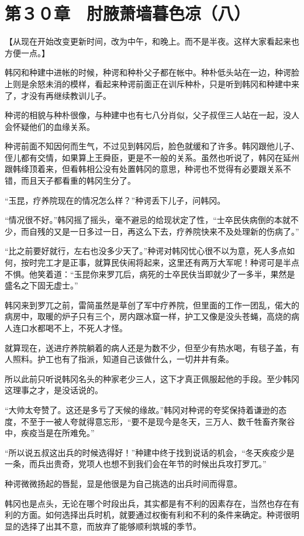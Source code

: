 \section{第３０章　肘腋萧墙暮色凉（八）}

【从现在开始改变更新时间，改为中午，和晚上。而不是半夜。这样大家看起来也方便一点。】

韩冈和种建中进帐的时候，种谔和种朴父子都在帐中。种朴低头站在一边，种谔脸上则是余怒未消的模样，看起来种谔前面正在训斥种朴，只是听到韩冈和种建中来了，才没有再继续教训儿子。

种谔的相貌与种朴很像，与种建中也有七八分肖似，父子叔侄三人站在一起，没人会怀疑他们的血缘关系。

种谔前面不知因何而生气，不过见到韩冈后，脸色就缓和了许多。韩冈跟他儿子、侄儿都有交情，如果算上王舜臣，更是不一般的关系。虽然也听说了，韩冈在延州跟韩绛顶着来，但看韩相公没有处置韩冈的意思，种谔也不觉得有必要跟关系不错，而且天子都看重的韩冈生分了。

“玉昆，疗养院现在的情况怎么样？”种谔丢下儿子，问韩冈。

“情况很不好。”韩冈摇了摇头，毫不避忌的给现状定了性，“士卒民伕病倒的本就不少，而自残的又是一日多过一日，再这么下去，疗养院快来不及处理新的伤病了。”

“比之前要好就行，左右也没多少天了。”种谔对韩冈忧心很不以为意，死人多点如何，按时完工才是正事，就算民伕闹将起来，这里还有两万大军呢！种谔可是半点不惧。他笑着道：“玉昆你来罗兀后，病死的士卒民伕当即就少了一多半，果然是盛名之下固无虚士。”

韩冈来到罗兀之前，雷简虽然是草创了军中疗养院，但里面的工作一团乱，偌大的病房中，取暖的炉子只有三个，房内跟冰窟一样，护工又像是没头苍蝇，高烧的病人连口水都喝不上，不死人才怪。

就算现在，送进疗养院躺着的病人还是为数不少，但至少有热水喝，有毯子盖，有人照料。护工也有了指派，知道自己该做什么，一切井井有条。

所以此前只听说韩冈名头的种家老少三人，这下才真正佩服起他的手段。至少韩冈这理事之才，是没话说的。

“大帅太夸赞了。这还是多亏了天候的缘故。”韩冈对种谔的夸奖保持着谦逊的态度，不至于一被人夸就得意忘形，“要不是现今是冬天，三万人、数千牲畜齐聚谷中，疾疫当是在所难免。”

“所以说五叔这出兵的时候选得好！”种建中终于找到说话的机会，“冬天疾疫少是一条，而兵出贵奇，党项人也想不到我们会在年节的时候出兵攻打罗兀。”

种谔微微扬起的唇髭，显是他很是为自己挑选的出兵时间而得意。

韩冈也是点头，无论在哪个时段出兵，其实都是有不利的因素存在，当然也存在有利的方面。如何选择出兵时机，就要通过权衡有利和不利的条件来确定。种谔很明显的选择了出其不意，而放弃了能够顺利筑城的季节。


